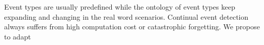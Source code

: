 Event types are usually predefined while the ontology of event types keep expanding and changing in the real word scenarios. Continual event detection always suffers from high computation cost or catastrophic forgetting. We propose to adapt 